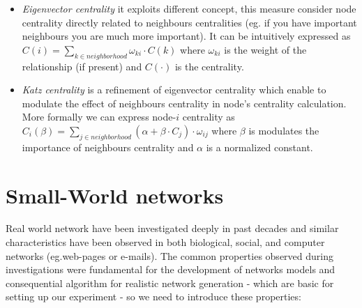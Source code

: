 \begin{description}
\begin{itemize}
\item \emph{Eigenvector centrality} it exploits different concept, this measure consider node centrality directly related to neighbours centralities\cite{newman:2010} (eg. if you have important neighbours you are much more important). It can be intuitively expressed as $C(i)=\sum_{k \in neighborhood}{\omega_{ki} \cdot C(k)}$ where $\omega_{ki}$ is the weight of the relationship (if present) and $C(\cdot)$ is the centrality.
\item \emph{Katz centrality} is a refinement of eigenvector centrality which enable to modulate the effect of neighbours centrality in node's centrality calculation. More formally we can express node-$i$ centrality as $C_{i}(\beta)= \sum_{j \in neighborhood}{(\alpha + \beta \cdot C_{j})\cdot \omega_{ij}}$ where $\beta$ is modulates the importance of neighbours centrality and $\alpha$ is a normalized constant.
\end{itemize}
\end{description}

\section{Small-World networks}
\label{sn_smallworld}
Real world network have been investigated deeply in past decades and similar characteristics have been observed in both biological, social, and computer networks (eg.web-pages or e-mails\cite{ebel02:_scale}). 
The common properties observed during investigations were fundamental for the development of networks models and consequential algorithm for realistic network generation - which are basic for setting up our experiment - so we need to introduce these properties:

